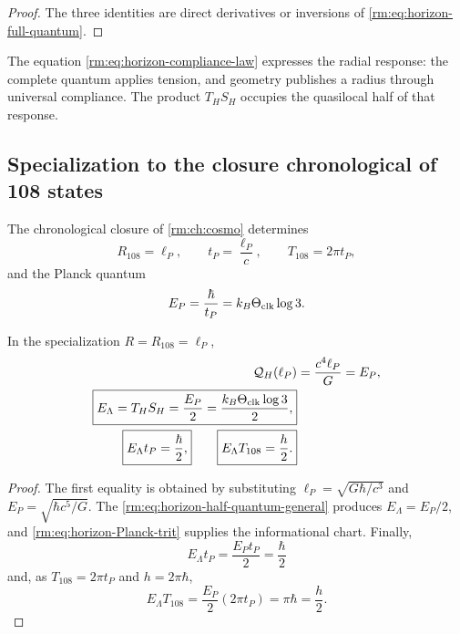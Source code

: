 \begin{proof}
The three identities are direct derivatives or inversions of
\cref{rm:eq:horizon-full-quantum}.
\end{proof}

The equation \cref{rm:eq:horizon-compliance-law} expresses the radial response:
the complete quantum applies tension, and geometry publishes a radius through
universal compliance. The product \(T_HS_H\) occupies the quasilocal half
of that response.

\subsection{Specialization to the closure chronological of 108 states}

The chronological closure of \cref{rm:ch:cosmo} determines
\begin{equation}
 R_{108}=\ell_P,
 \qquad
 t_P=\frac{\ell_P}{c},
 \qquad
 T_{108}=2\pi t_P,
 \label{rm:eq:horizon-CT108-scales}
\end{equation}
and the Planck quantum
\begin{equation}
 E_P=\frac{\hbar}{t_P}
 =k_B\Theta_{\rm clk}\log3.
 \label{rm:eq:horizon-Planck-trit}
\end{equation}

\begin{theorem}
\label{rm:thm:horizon-half-action}
In the specialization \(R=R_{108}=\ell_P\),
\begin{align}
 \mathcal Q_H(\ell_P)
 &=\frac{c^4\ell_P}{G}=E_P,
 \label{rm:eq:horizon-QH-EP}\\
 \boxed{
 E_\Lambda=T_HS_H
 =\frac{E_P}{2}
 =\frac{k_B\Theta_{\rm clk}\log3}{2},}
 \label{rm:eq:horizon-CT108-half-energy}\\
 \boxed{E_\Lambda t_P=\frac{\hbar}{2},}
 \qquad
 \boxed{E_\Lambda T_{108}=\frac h2.}
 \label{rm:eq:horizon-half-actions}
\end{align}
\end{theorem}

\begin{proof}
The first equality is obtained by substituting
\(\ell_P=\sqrt{G\hbar/c^3}\) and
\(E_P=\sqrt{\hbar c^5/G}\). The
\cref{rm:eq:horizon-half-quantum-general} produces
\(E_\Lambda=E_P/2\), and
\cref{rm:eq:horizon-Planck-trit} supplies the informational chart. Finally,
\[
 E_\Lambda t_P=\frac{E_Pt_P}{2}=\frac\hbar2
\]
and, as \(T_{108}=2\pi t_P\) and \(h=2\pi\hbar\),
\[
 E_\Lambda T_{108}
 =\frac{E_P}{2}(2\pi t_P)=\pi\hbar=\frac h2.
\]
\end{proof}

